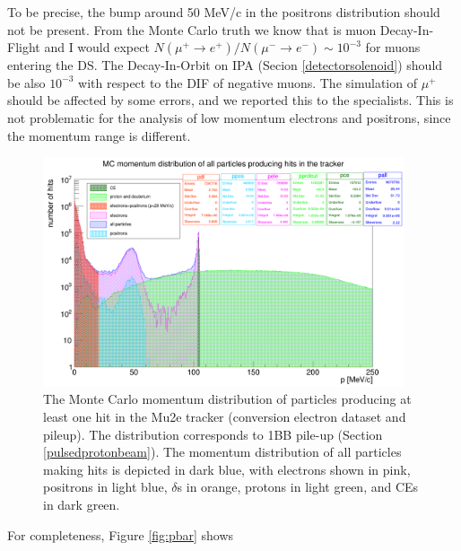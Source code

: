 To be precise, the bump around 50 MeV/c in the positrons distribution should not be present.
From the Monte Carlo truth we know that is muon Decay-In-Flight and 
I would expect $N(\mu^+ \rightarrow e^+ )/N(\mu^- \rightarrow e^- ) \sim 10^{-3}$ for muons entering the DS.
The Decay-In-Orbit on IPA (Secion \ref{detectorsolenoid}) should be also $10^{-3}$ with respect to the DIF of negative muons.
The simulation of $\mu^+$ should be affected by some errors, and we reported this to the specialists.
This is not problematic for the analysis of low momentum electrons and positrons, since the momentum range is 
different.

\begin{figure}[!h]
        \centering
        \includegraphics[width =0.95\textwidth]{figures/png/Screenshot_20240812_152905.png}
    \caption[Monte Carlo momentum distribution of particles producing hits in the Mu2e tracker (conversion electron dataset and pileup).]{
       The Monte Carlo momentum distribution of particles producing at 
       least one hit in the Mu2e tracker (conversion electron dataset and pileup). The distribution
       corresponds to 1BB pile-up (Section \ref{pulsedprotonbeam}). The momentum distribution 
       of all particles making hits is depicted in dark blue, with electrons 
       shown in pink, positrons in light blue, $\delta$s in orange, protons in 
       light green, and CEs in dark green. }
       \label{fig:momhits}
\end{figure}





For completeness, Figure \ref{fig:pbar} shows 

